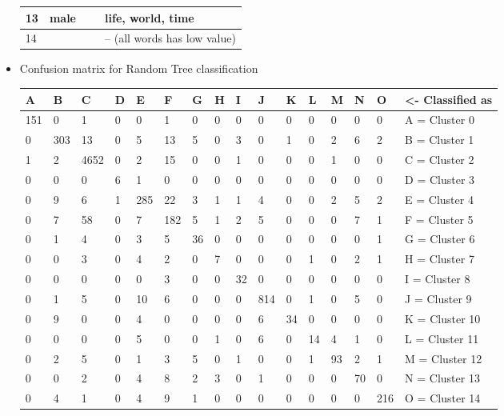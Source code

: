 \begin{itemize}
\begin{table}[H]
\begin{tabular}{|l|l|l|l|}
    13      & male   & ~                   & life,  world, time                             \\ \hline
    14      & ~      & ~                   & -- (all words has low value)                   \\ \hline
    \end{tabular}
	\end{table}
	\item Confusion matrix for Random Tree classification 
	\begin{table}[H]
    \begin{tabular}{|l|l|l|l|l|l|l|l|l|l|l|l|l|l|l|l|}
    \hline
    A   & B   & C    & D & E   & F   & G  & H & I  & J   & K  & L  & M  & N  & O   & <- Classified as \\ \hline
    151 & 0   & 1    & 0 & 0   & 1   & 0  & 0 & 0  & 0   & 0  & 0  & 0  & 0  & 0   & A = Cluster 0    \\ \hline
    0   & 303 & 13   & 0 & 5   & 13  & 5  & 0 & 3  & 0   & 1  & 0  & 2  & 6  & 2   & B = Cluster 1    \\ \hline
    1   & 2   & 4652 & 0 & 2   & 15  & 0  & 0 & 1  & 0   & 0  & 0  & 1  & 0  & 0   & C = Cluster 2    \\ \hline
    0   & 0   & 0    & 6 & 1   & 0   & 0  & 0 & 0  & 0   & 0  & 0  & 0  & 0  & 0   & D = Cluster 3    \\ \hline
    0   & 9   & 6    & 1 & 285 & 22  & 3  & 1 & 1  & 4   & 0  & 0  & 2  & 5  & 2   & E = Cluster 4    \\ \hline
    0   & 7   & 58   & 0 & 7   & 182 & 5  & 1 & 2  & 5   & 0  & 0  & 0  & 7  & 1   & F = Cluster 5    \\ \hline
    0   & 1   & 4    & 0 & 3   & 5   & 36 & 0 & 0  & 0   & 0  & 0  & 0  & 0  & 1   & G = Cluster 6    \\ \hline
    0   & 0   & 3    & 0 & 4   & 2   & 0  & 7 & 0  & 0   & 0  & 1  & 0  & 2  & 1   & H = Cluster 7    \\ \hline
    0   & 0   & 0    & 0 & 0   & 3   & 0  & 0 & 32 & 0   & 0  & 0  & 0  & 0  & 0   & I = Cluster 8    \\ \hline
    0   & 1   & 5    & 0 & 10  & 6   & 0  & 0 & 0  & 814 & 0  & 1  & 0  & 5  & 0   & J = Cluster 9    \\ \hline
    0   & 9   & 0    & 0 & 4   & 0   & 0  & 0 & 0  & 6   & 34 & 0  & 0  & 0  & 0   & K = Cluster 10   \\ \hline
    0   & 0   & 0    & 0 & 5   & 0   & 0  & 1 & 0  & 6   & 0  & 14 & 4  & 1  & 0   & L = Cluster 11   \\ \hline
    0   & 2   & 5    & 0 & 1   & 3   & 5  & 0 & 1  & 0   & 0  & 1  & 93 & 2  & 1   & M = Cluster 12   \\ \hline
    0   & 0   & 2    & 0 & 4   & 8   & 2  & 3 & 0  & 1   & 0  & 0  & 0  & 70 & 0   & N = Cluster 13   \\ \hline
    0   & 4   & 1    & 0 & 4   & 9   & 1  & 0 & 0  & 0   & 0  & 0  & 0  & 0  & 216 & O = Cluster 14   \\ \hline
    \end{tabular}
\end{table}
\end{itemize}
